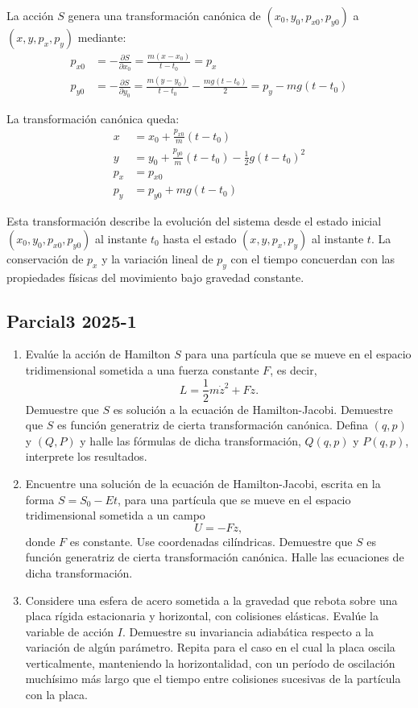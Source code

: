 \documentclass[12pt]{article}
\begin{document}
\begin{enumerate}
  La acción $S$ genera una transformación canónica de $(x_0,y_0,p_{x0},p_{y0})$ a $(x,y,p_x,p_y)$ mediante:
  \begin{align}
  p_{x0} &= -\frac{\partial S}{\partial x_0} = \frac{m(x-x_0)}{t-t_0} = p_x \\
  p_{y0} &= -\frac{\partial S}{\partial y_0} = \frac{m(y-y_0)}{t-t_0} - \frac{mg(t-t_0)}{2} = p_y - mg(t-t_0)
  \end{align}

  La transformación canónica queda:
  \begin{align}
  x &= x_0 + \frac{p_{x0}}{m}(t-t_0) \\
  y &= y_0 + \frac{p_{y0}}{m}(t-t_0) - \frac{1}{2}g(t-t_0)^2 \\
  p_x &= p_{x0} \\
  p_y &= p_{y0} + mg(t-t_0)
  \end{align}

  Esta transformación describe la evolución del sistema desde el estado inicial $(x_0,y_0,p_{x0},p_{y0})$ al instante $t_0$ hasta el estado $(x,y,p_x,p_y)$ al instante $t$. La conservación de $p_x$ y la variación lineal de $p_y$ con el tiempo concuerdan con las propiedades físicas del movimiento bajo gravedad constante.
\end{enumerate}

\subsection*{Parcial3 2025-1}
\begin{enumerate}
    \item Evalúe la acción de Hamilton $S$ para una partícula que se mueve en el espacio tridimensional sometida a una fuerza constante $F$, es decir,
    \[L = \frac{1}{2}m\dot{z}^2 + Fz.\]
    Demuestre que $S$ es solución a la ecuación de Hamilton-Jacobi. Demuestre que $S$ es función generatriz de cierta transformación canónica. Defina $(q,p)$ y $(Q,P)$ y halle las fórmulas de dicha transformación, $Q(q,p)$ y $P(q,p)$, interprete los resultados.
    
    \item Encuentre una solución de la ecuación de Hamilton-Jacobi, escrita en la forma $S = S_0 - Et$, para una partícula que se mueve en el espacio tridimensional sometida a un campo
    \[U = -Fz,\]
    donde $F$ es constante. Use coordenadas cilíndricas. Demuestre que $S$ es función generatriz de cierta transformación canónica. Halle las ecuaciones de dicha transformación.
    
    \item Considere una esfera de acero sometida a la gravedad que rebota sobre una placa rígida estacionaria y horizontal, con colisiones elásticas. Evalúe la variable de acción $I$. Demuestre su invariancia adiabática respecto a la variación de algún parámetro. Repita para el caso en el cual la placa oscila verticalmente, manteniendo la horizontalidad, con un período de oscilación muchísimo más largo que el tiempo entre colisiones sucesivas de la partícula con la placa.
\end{enumerate}
\end{document}
